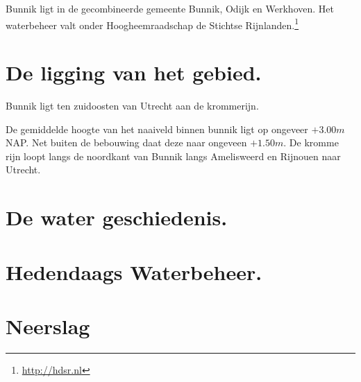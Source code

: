 Bunnik ligt in de gecombineerde gemeente Bunnik, Odijk en Werkhoven.
Het waterbeheer valt onder Hoogheemraadschap de Stichtse Rijnlanden.\footnote{\url{http://hdsr.nl}}

\section{De ligging van het gebied.}
Bunnik ligt ten zuidoosten van Utrecht aan de krommerijn.

De gemiddelde hoogte van het naaiveld binnen bunnik ligt op ongeveer $+3.00 m$ NAP.
Net buiten de bebouwing daat deze naar ongeveen $+1.50 m$.
De kromme rijn loopt langs de noordkant van Bunnik langs Amelisweerd en Rijnouen naar Utrecht.

\section{De water geschiedenis.}
\section{Hedendaags Waterbeheer.}
\section{Neerslag}
